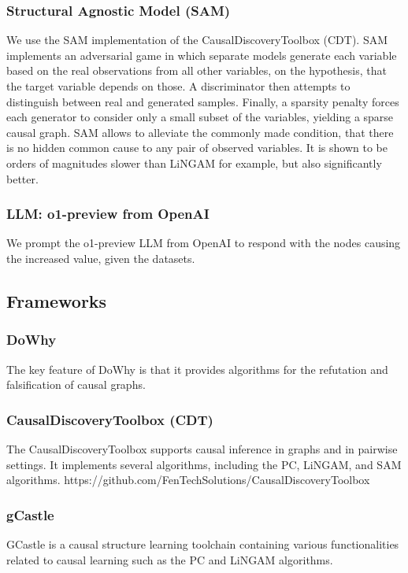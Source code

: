 \documentclass{article}
\begin{document}
    \subsubsection{Structural Agnostic Model (SAM)}
    We use the SAM\cite{SAM} implementation of the CausalDiscoveryToolbox (CDT). SAM implements an adversarial game in which separate models generate each variable based on the real observations from all other variables, on the hypothesis, that the target variable depends on those. A discriminator then attempts to distinguish between real and generated samples. Finally, a sparsity penalty forces each generator to consider only a small subset of the variables, yielding a sparse causal graph. SAM allows to alleviate the commonly made condition, that there is no hidden common cause to any pair of observed variables.
    It is shown to be orders of magnitudes slower than LiNGAM for example, but also significantly better.

    \subsubsection{LLM: o1-preview from OpenAI}
    We prompt the o1-preview LLM from OpenAI to respond with the nodes causing the increased value, given the datasets.
    
    \subsection{Frameworks}
    \subsubsection{DoWhy}
    The key feature of DoWhy \cite{DoWhy} \cite{sharma2020dowhyendtoendlibrarycausal} is that it provides algorithms for the refutation and falsification of causal graphs.
    
    
    \subsubsection{CausalDiscoveryToolbox (CDT)}
    The CausalDiscoveryToolbox supports causal inference in graphs and in pairwise settings. It implements several algorithms, including the PC, LiNGAM, and SAM algorithms.
    https://github.com/FenTechSolutions/CausalDiscoveryToolbox 
    \cite{CDT}
    
    \subsubsection{gCastle}
    GCastle is a causal structure learning toolchain containing various functionalities related to causal learning such as the PC and LiNGAM algorithms. 
    \cite{zhang2021gcastlepythontoolboxcausal}
    
\end{document}
